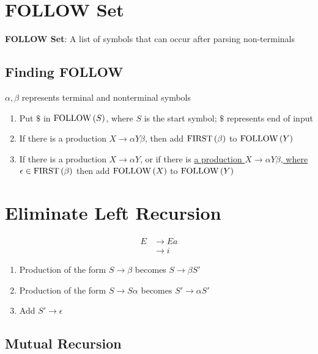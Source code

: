 \section{FOLLOW Set}

  \begin{definition}
    \textbf{FOLLOW Set}: A list of symbols that can occur after parsing
    non-terminals
  \end{definition}

  \subsection{Finding FOLLOW}

    $ \alpha, \beta $ represents terminal and nonterminal symbols

    \begin{enumerate}
      \item Put $ \$ $ in $ \operatorname{FOLLOW}\left( S \right) $, where $ S $ is the start
      symbol; $ \$ $ represents end of input
      \item If there is a production $ X \to \alpha Y \beta $, then add
      $ \operatorname{FIRST}\left( \beta \right) $ to $ \operatorname{FOLLOW}\left( Y \right) $
      \item If there is a production $ X \to \alpha Y $, or if there is \ul{a
      production $ X \to \alpha Y \beta $, where
      $ \epsilon \in \operatorname{FIRST}\left( \beta \right) $} then add
      $ \operatorname{FOLLOW}\left( X \right) $ to $ \operatorname{FOLLOW}\left( Y \right) $
    \end{enumerate}

\section{Eliminate Left Recursion}
\label{section: grammar/eliminate left recursion}

  \begin{align*}
    E &\to Ea \\
    &\to i
  \end{align*}

  \begin{enumerate}
    \item Production of the form $ S \to \beta $ becomes $ S \to \beta S' $
    \item Production of the form $ S \to S \alpha $ becomes $ S' \to \alpha S' $
    \item Add $ S' \to \epsilon $
  \end{enumerate}

  \subsection{Mutual Recursion}

